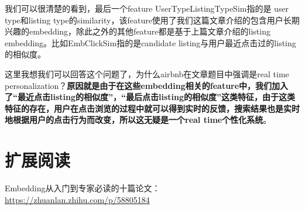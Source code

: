 \documentclass[12pt]{article}
\begin{document}
我们可以很清楚的看到，最后一个feature UserTypeListingTypeSim指的是 user type和listing type的similarity，该feature使用了我们这篇文章介绍的包含用户长期兴趣的embedding，除此之外的其他feature都是基于上篇文章介绍的listing embedding。比如EmbClickSim指的是candidate listing与用户最近点击过的listing的相似度。

这里我想我们可以回答这个问题了，为什么airbnb在文章题目中强调是real time personalization？\textbf{原因就是由于在这些embedding相关的feature中，我们加入了“最近点击listing的相似度”，“最后点击listing的相似度”这类特征，由于这类特征的存在，用户在点击浏览的过程中就可以得到实时的反馈，搜索结果也是实时地根据用户的点击行为而改变，所以这无疑是一个real time个性化系统}。


\section{扩展阅读}
Embedding从入门到专家必读的十篇论文：\url{https://zhuanlan.zhihu.com/p/58805184}



\end{document}
